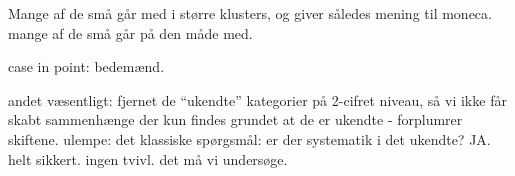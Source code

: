 Mange af de små går med i større klusters, og giver således mening til moneca. mange af de små går på den måde med. 





case in point: bedemænd. 


andet væsentligt: fjernet de “ukendte” kategorier på 2-cifret %
niveau, så vi ikke får skabt sammenhænge der kun findes grundet at de er ukendte - forplumrer skiftene. ulempe: det klassiske spørgsmål: er der systematik i det ukendte? JA. helt sikkert. ingen tvivl. det må vi undersøge. %



